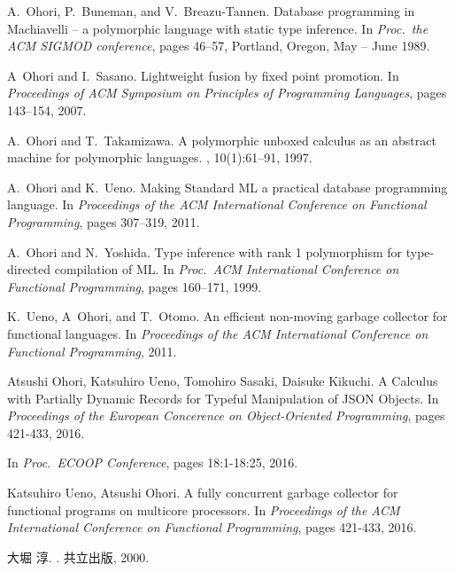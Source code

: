 \documentclass{jbook}
\begin{document}
\begin{thebibliography}{10}
A.~Ohori, P.~Buneman, and V.~Breazu-Tannen.
\newblock Database programming in {Machiavelli} -- a polymorphic language with
  static type inference.
\newblock In {\em Proc.\ the ACM SIGMOD conference}, pages 46--57, Portland,
  Oregon, May -- June 1989.

A~Ohori and I.~Sasano.
\newblock Lightweight fusion by fixed point promotion.
\newblock In {\em Proceedings of ACM Symposium on Principles of Programming
  Languages}, pages 143--154, 2007.

A.~Ohori and T.~Takamizawa.
\newblock A polymorphic unboxed calculus as an abstract machine for polymorphic
  languages.
, 10(1):61--91, 1997.

A.~Ohori and K.~Ueno.
\newblock Making {Standard ML} a practical database programming language.
\newblock In {\em Proceedings of the ACM International Conference on Functional
  Programming}, pages 307--319, 2011.

A.~Ohori and N.~Yoshida.
\newblock Type inference with rank 1 polymorphism for type-directed compilation
  of {ML}.
\newblock In {\em Proc.\ ACM International Conference on Functional
  Programming}, pages 160--171, 1999.

K.~Ueno, A~Ohori, and T.~Otomo.
\newblock An efficient non-moving garbage collector for functional languages.
\newblock In {\em Proceedings of the ACM International Conference on Functional
  Programming}, 2011.

Atsushi Ohori, Katsuhiro Ueno, Tomohiro Sasaki, Daisuke Kikuchi.
\newblock A Calculus with Partially Dynamic Records for Typeful Manipulation of JSON Objects. 
\newblock In {\em Proceedings of the European Concerence on
Object-Oriented  Programming}, pages 421-433, 2016. 

\newblock In {\em Proc.\ ECOOP Conference}, pages 18:1-18:25, 2016.

Katsuhiro Ueno, Atsushi Ohori.
\newblock A fully concurrent garbage collector for functional programs on multicore processors. 
\newblock In {\em Proceedings of the ACM International Conference on Functional
  Programming}, pages 421-433, 2016.


大堀 淳.
.
\newblock 共立出版, 2000.



\end{thebibliography}

 
\end{document}
